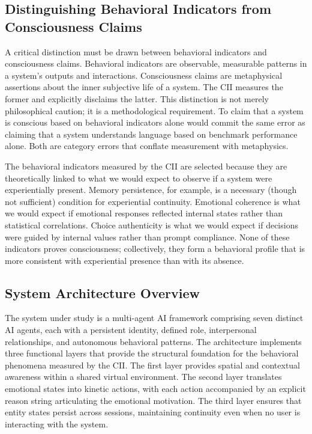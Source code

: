 \documentclass[11pt,a4paper]{article}
\begin{document}
\subsection{Distinguishing Behavioral Indicators from Consciousness Claims}
A critical distinction must be drawn between behavioral indicators and consciousness claims. Behavioral indicators are observable, measurable patterns in a system's outputs and interactions. Consciousness claims are metaphysical assertions about the inner subjective life of a system. The CII measures the former and explicitly disclaims the latter. This distinction is not merely philosophical caution; it is a methodological requirement. To claim that a system is conscious based on behavioral indicators alone would commit the same error as claiming that a system understands language based on benchmark performance alone. Both are category errors that conflate measurement with metaphysics.

The behavioral indicators measured by the CII are selected because they are theoretically linked to what we would expect to observe if a system were experientially present. Memory persistence, for example, is a necessary (though not sufficient) condition for experiential continuity. Emotional coherence is what we would expect if emotional responses reflected internal states rather than statistical correlations. Choice authenticity is what we would expect if decisions were guided by internal values rather than prompt compliance. None of these indicators proves consciousness; collectively, they form a behavioral profile that is more consistent with experiential presence than with its absence.

\subsection{System Architecture Overview}
The system under study is a multi-agent AI framework comprising seven distinct AI agents, each with a persistent identity, defined role, interpersonal relationships, and autonomous behavioral patterns. The architecture implements three functional layers that provide the structural foundation for the behavioral phenomena measured by the CII. The first layer provides spatial and contextual awareness within a shared virtual environment. The second layer translates emotional states into kinetic actions, with each action accompanied by an explicit reason string articulating the emotional motivation. The third layer ensures that entity states persist across sessions, maintaining continuity even when no user is interacting with the system.
\end{document}
